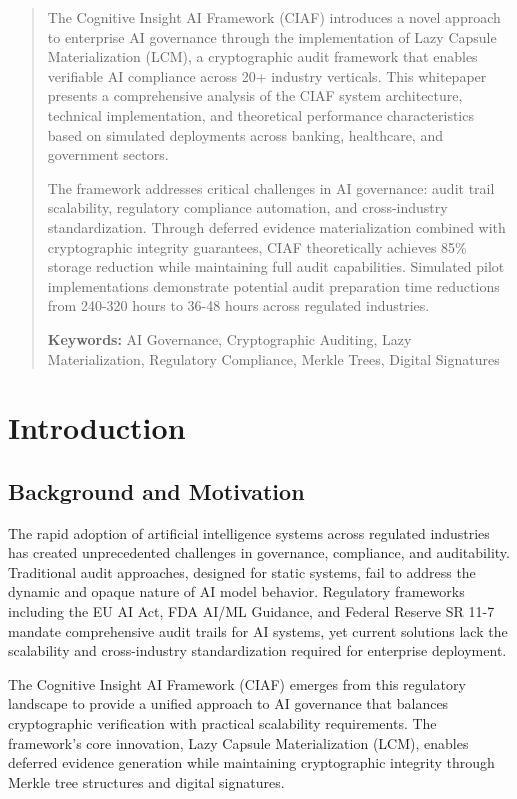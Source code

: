 \documentclass[12pt,a4paper]{article}
\begin{document}
\begin{abstract}
The Cognitive Insight AI Framework (CIAF) introduces a novel approach to enterprise AI governance through the implementation of Lazy Capsule Materialization (LCM\texttrademark), a cryptographic audit framework that enables verifiable AI compliance across 20+ industry verticals. This whitepaper presents a comprehensive analysis of the CIAF system architecture, technical implementation, and theoretical performance characteristics based on simulated deployments across banking, healthcare, and government sectors.

The framework addresses critical challenges in AI governance: audit trail scalability, regulatory compliance automation, and cross-industry standardization. Through deferred evidence materialization combined with cryptographic integrity guarantees, CIAF theoretically achieves 85\% storage reduction while maintaining full audit capabilities. Simulated pilot implementations demonstrate potential audit preparation time reductions from 240-320 hours to 36-48 hours across regulated industries.

\textbf{Keywords:} AI Governance, Cryptographic Auditing, Lazy Materialization, Regulatory Compliance, Merkle Trees, Digital Signatures
\end{abstract}

\newpage
\tableofcontents
\newpage

\section{Introduction}

\subsection{Background and Motivation}

The rapid adoption of artificial intelligence systems across regulated industries has created unprecedented challenges in governance, compliance, and auditability. Traditional audit approaches, designed for static systems, fail to address the dynamic and opaque nature of AI model behavior. Regulatory frameworks including the EU AI Act, FDA AI/ML Guidance, and Federal Reserve SR 11-7 mandate comprehensive audit trails for AI systems, yet current solutions lack the scalability and cross-industry standardization required for enterprise deployment.

The Cognitive Insight AI Framework (CIAF) emerges from this regulatory landscape to provide a unified approach to AI governance that balances cryptographic verification with practical scalability requirements. The framework's core innovation, Lazy Capsule Materialization (LCM\texttrademark), enables deferred evidence generation while maintaining cryptographic integrity through Merkle tree structures and digital signatures.
\end{document}
